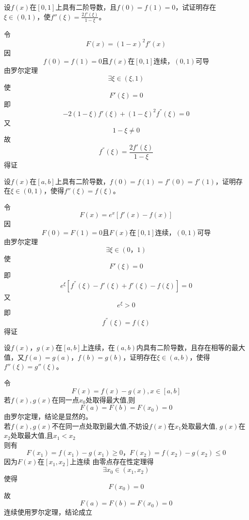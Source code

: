 \begin{example}
	设$f(x)$在$[0,1]$上具有二阶导数，且$f(0)=f(1)=0$，试证明存在$\xi\in(0,1)$，使$f''(\xi)=\frac{2f'(\xi)}{1-\xi}$。
\end{example}
	\begin{newproof}
		令\[F\left( x \right) =\left( 1-x \right) ^2f'\left( x \right) \]
		因\[f\left( 0 \right) =f\left( 1 \right) =0\text{且}f\left( x \right) \text{在}\left[ 0,1 \right] \text{连续，}\left( 0,1 \right) \text{可导}\]
		由罗尔定理\[\exists \xi \in \left( \xi ,1 \right) \]
		使\[F'\left( \xi \right) =0\]
		即\[-2\left( 1-\xi \right) f'\left( \xi \right) +\left( 1-\xi \right) ^2f^{''}\left( \xi \right) =0\]
		又\[1-\xi \ne 0\]
		故\[f^{''}\left( \xi \right) =\frac{2f'\left( \xi \right)}{1-\xi}\]
		得证
	\end{newproof}

\begin{example}
	设$f(x)$在$[a,b]$上具有二阶导数，$f(0)=f(1)=f'(0)=f'(1)$，证明存在$\xi\in(0,1)$，使得$f''(\xi)=f(\xi)$。
\end{example}
	\begin{newproof}
		令\[F\left( x \right) =e^x\left[ f'\left( x \right) -f\left( x \right) \right] \]
		因\[F\left( 0 \right) =F\left( 1 \right) =0\text{且}F\left( x \right) \text{在}\left[ 0,1 \right] \text{连续，}\left( 0,1 \right) \text{可导}\]
		由罗尔定理\[\exists \xi \in \left( 0\text{，}1 \right) \]
		使\[F'\left( \xi \right) =0\]
		即\[e^{\xi}\left[ f^{''}\left( \xi \right) -f'\left( \xi \right) +f'\left( \xi \right) -f\left( \xi \right) \right] =0\]
		又\[e^{\xi}>0\]
		即\[f^{''}\left( \xi \right) =f\left( \xi \right) \]
		得证
	\end{newproof}

\begin{example}
	设$f(x)$，$g(x)$在$[a,b]$上连续，在$(a,b)$内具有二阶导数，且存在相等的最大值，又$f(a)=g(a)$，$f(b)=g(b)$，证明存在$\xi\in(a,b)$，使得$f''(\xi)=g''(\xi)$。
\end{example}
	\begin{newproof}
		令\[F\left( x \right) =f\left( x \right) -g\left( x \right) , x\in \left[ a,b \right] \]
		若$f\left( x \right) ,g\left( x \right) $在同一点$x_0$处取得最大值,则\[F\left( a \right) =F\left( b \right) =F\left( x_0 \right) =0\]
		由罗尔定理，结论是显然的。\\
		若$f(x),g(x)$不在同一点处取到最大值,不妨设$f(x)$在$x_1$处取最大值, $g(x)$在$x_2$处取最大值,且$x_1<x_2$\\
		则有\[F\left( x_1 \right) =f\left( x_1 \right) -g\left( x_1 \right) \geqslant 0\text{，}F\left( x_2 \right) =f\left( x_2 \right) -g\left( x_2 \right) \leqslant 0\]
		因为$F(x)$在$\left[ x_1,x_2 \right] $上连续
		由零点存在性定理得\[\exists x_0\in \left( x_1,x_2 \right) \]
		使得\[F\left( x_0 \right) =0\]
		故\[F\left( a \right) =F\left( b \right) =F\left( x_0 \right) =0\]
		连续使用罗尔定理，结论成立
	\end{newproof}


